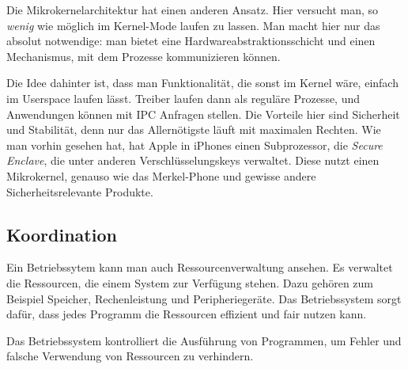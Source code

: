 \documentclass[ngerman,abstract=true]{scrartcl}
\begin{document}
Die Mikrokernelarchitektur hat einen anderen Ansatz. Hier versucht man, so \emph{wenig} wie möglich im Kernel-Mode laufen zu lassen. Man macht hier nur das absolut notwendige: man bietet eine Hardwareabstraktionsschicht und einen Mechanismus, mit dem Prozesse kommunizieren können. 

Die Idee dahinter ist, dass man Funktionalität, die sonst im Kernel wäre, einfach im Userspace laufen lässt. Treiber laufen dann als reguläre Prozesse, und Anwendungen können mit IPC Anfragen stellen. Die Vorteile hier sind Sicherheit und Stabilität, denn nur das Allernötigste läuft mit maximalen Rechten. Wie man vorhin gesehen hat, hat Apple in iPhones einen Subprozessor, die \emph{Secure Enclave}, die unter anderen Verschlüsselungskeys verwaltet. Diese nutzt einen Mikrokernel, genauso wie das Merkel-Phone und gewisse andere Sicherheitsrelevante Produkte.

\subsection{Koordination}

Ein Betriebssytem kann man auch Ressourcenverwaltung ansehen. Es verwaltet die Ressourcen, die einem System zur Verfügung stehen. Dazu gehören zum Beispiel Speicher, Rechenleistung und Peripheriegeräte. Das Betriebssystem sorgt dafür, dass jedes Programm die Ressourcen effizient und fair nutzen kann.

Das Betriebssystem kontrolliert die Ausführung von Programmen, um Fehler und falsche Verwendung von Ressourcen zu verhindern.
\end{document}
